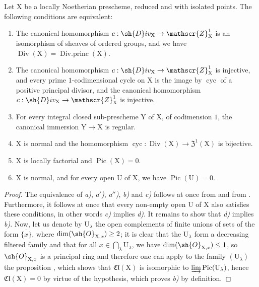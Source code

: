 \begin{proposition}[21.7.4]
\label{IV.21.7.4}
Let $\mathrm{X}$ be a locally Noetherian prescheme, reduced and with isolated points.
The following conditions are equivalent:
\begin{enumerate}[label=\emph{\alph*)}]
  \item The canonical homomorphism $c:\sh{D}iv_\mathrm{X}\to\mathscr{Z}_\mathrm{X}^1$  is an isomorphism of sheaves of ordered groups, and we have $\operatorname{Div}(\mathrm{X})=\operatorname{Div.princ}(\mathrm{X})$.
  \item[\rm a$'$)] The canonical homomorphism $c:\sh{D}iv_\mathrm{X}\to\mathscr{Z}_\mathrm{X}^1$ is injective, and every prime $1$-codimensional cycle on $\mathrm{X}$ is the image by $\operatorname{cyc}$ of a positive principal divisor, and the canonical homomorphism $c:\sh{D}iv_\mathrm{X}\to\mathscr{Z}_\mathrm{X}^1$ is injective.
  \item[\rm a$''$)] For every integral closed sub-prescheme $\mathrm{Y}$ of $\mathrm{X}$, of codimension $1$, the canonical immersion $\mathrm{Y}\to\mathrm{X}$ is regular.
  \item $\mathrm{X}$ is normal and the homomorphism $\operatorname{cyc}:\operatorname{Div}(\mathrm{X})\to\mathfrak{Z}^1(\mathrm{X})$ is bijective.
  \item $\mathrm{X}$ is locally factorial and $\operatorname{Pic}(\mathrm{X})=0$.
  \item $\mathrm{X}$ is normal, and for every open $\mathrm{U}$ of $\mathrm{X}$, we have $\operatorname{Pic}(\mathrm{U})=0$.
\end{enumerate}
\end{proposition}

\begin{proof}
The equivalence of \emph{a)}, \emph{a$'$)}, \emph{a$''$)}, \emph{b)} and \emph{c)} follows at once from  and from .
Furthermore, it follows at once that every non-empty open $\mathrm{U}$ of $\mathrm{X}$ also satisfies these conditions, in other words \emph{c)} implies \emph{d)}.
It remains to show that \emph{d)} implies \emph{b)}.
Now, let us denote by $\mathrm{U}_\lambda$ the open complements of finite unions of sets of the form $\overline{\{x\}}$, where $\dim(\sh{O}_{\mathrm{X},x})\geq 2$;
it is clear that the $\mathrm{U}_\lambda$ form a decreasing filtered family and that for all $x\in\bigcap_\lambda\mathrm{U}_\lambda$, we have $\dim(\sh{O}_{\mathrm{X},x})\leq 1$, so $\sh{O}_{\mathrm{X},x}$ is a principal ring and therefore one can apply to the family $(\mathrm{U}_\lambda)$ the proposition , which shows that $\mathfrak{Cl}(\mathrm{X})$ is isomorphic to $\varinjlim\operatorname{Pic}(\mathrm{U}_\lambda)$, hence $\mathfrak{Cl}(\mathrm{X})=0$ by virtue of the hypothesis, which proves \emph{b)} by definition.
\end{proof}

